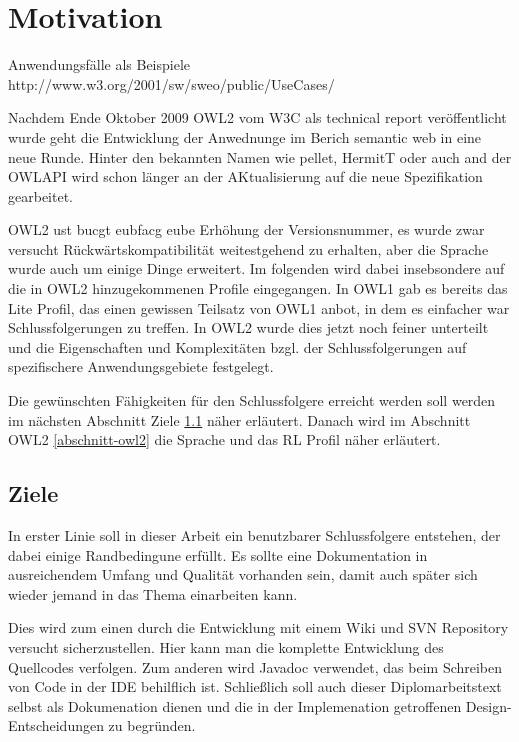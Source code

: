 \chapter{Motivation}
\label{kapitel-motivation}

Anwendungsfälle als Beispiele
http://www.w3.org/2001/sw/sweo/public/UseCases/


Nachdem Ende Oktober 2009 OWL2 vom W3C als technical report veröffentlicht wurde geht die Entwicklung der Anwednunge im Berich semantic web in eine neue Runde. Hinter den bekannten Namen wie pellet, HermitT oder auch and der OWLAPI wird schon länger an der AKtualisierung auf die neue Spezifikation gearbeitet.

OWL2 ust bucgt eubfacg eube Erhöhung der Versionsnummer, es wurde zwar versucht Rückwärtskompatibilität weitestgehend zu erhalten, aber die Sprache wurde auch um einige Dinge erweitert. Im folgenden wird dabei  insebsondere auf die in OWL2 hinzugekommenen Profile eingegangen. In OWL1 gab es bereits das Lite Profil, das einen gewissen Teilsatz von OWL1 anbot, in dem es einfacher war Schlussfolgerungen zu treffen. In OWL2 wurde dies jetzt noch feiner unterteilt und die Eigenschaften und Komplexitäten bzgl. der Schlussfolgerungen auf spezifischere Anwendungsgebiete festgelegt.

Die gewünschten Fähigkeiten für den Schlussfolgere erreicht werden soll werden im nächsten Abschnitt Ziele \ref{abschnitt-ziele} näher erläutert. Danach wird im Abschnitt OWL2 \ref{abschnitt-owl2} die Sprache und das RL Profil näher erläutert.

\section{Ziele}
\label{abschnitt-ziele}

In erster Linie soll in dieser Arbeit ein benutzbarer Schlussfolgere entstehen, der dabei einige Randbedingune erfüllt. Es sollte eine Dokumentation in ausreichendem Umfang und Qualität vorhanden sein, damit auch später sich wieder jemand in das Thema einarbeiten kann.

Dies wird zum einen durch die Entwicklung mit einem Wiki und SVN Repository versucht sicherzustellen. Hier kann man die komplette Entwicklung des Quellcodes verfolgen. Zum anderen wird Javadoc verwendet, das beim Schreiben von Code in der IDE behilflich ist. Schließlich soll auch dieser Diplomarbeitstext selbst als Dokumenation dienen und die in der Implemenation getroffenen Design-Entscheidungen zu begründen.

